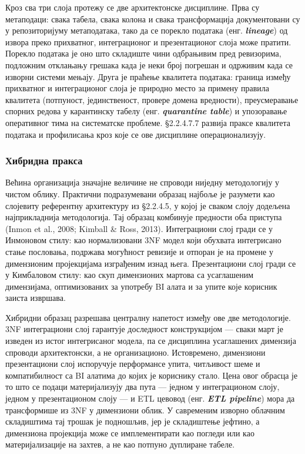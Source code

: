 Кроз сва три слоја протежу се две архитектонске дисциплине. Прва су метаподаци: свака табела, свака колона и свака трансформација документовани су у репозиторијуму метаподатака, тако да се порекло података (енг. \textbf{\textit{lineage}}) од извора преко прихватног, интеграционог и презентационог слоја може пратити. Порекло података је оно што складиште чини одбрањивим пред ревизорима, подложним отклањању грешака када је неки број погрешан и одрживим када се изворни системи мењају. Друга је праћење квалитета података: граница између прихватног и интеграционог слоја је природно место за примену правила квалитета (потпуност, јединственост, провере домена вредности), преусмеравање спорних редова у карантинску табелу (енг. \textbf{\textit{quarantine table}}) и упозоравање оперативног тима на систематске проблеме. §2.2.4.7.7 развија праксе квалитета података и профилисања кроз које се ове дисциплине операционализују.

\subsubsection{Хибридна пракса}
Већина организација значајне величине не спроводи ниједну методологију у чистом облику. Практични подразумевани образац најбоље је разумети као слојевиту референтну архитектуру из §2.2.4.5, у којој је сваком слоју додељена најприкладнија методологија. Тај образац комбинује предности оба приступа (Inmon et al., 2008; Kimball \& Ross, 2013). Интеграциони слој гради се у Инмоновом стилу: као нормализовани 3NF модел који обухвата интегрисано стање пословања, подржава могућност ревизије и отпоран је на промене у димензионим пројекцијама изграђеним изнад њега. Презентациони слој гради се у Кимбаловом стилу: као скуп димензионих мартова са усаглашеним димензијама, оптимизованих за употребу BI алата и за упите које корисник заиста извршава.

Хибридни образац разрешава централну напетост између ове две методологије. 3NF интеграциони слој гарантује доследност конструкцијом — сваки март је изведен из истог интегрисаног модела, па се дисциплина усаглашених димензија спроводи архитектонски, а не организационо. Истовремено, димензиони презентациони слој испоручује перформансе упита, читљивост шеме и компатибилност са BI алатима до којих је кориснику стало. Цена овог обрасца је то што се подаци материјализују два пута — једном у интеграционом слоју, једном у презентационом слоју — и ETL цевовод (енг. \textbf{\textit{ETL pipeline}}) мора да трансформише из 3NF у димензиони облик. У савременим изворно облачним складиштима тај трошак је подношљив, јер је складиштење јефтино, а димензиона пројекција може се имплементирати као погледи или као материјализације на захтев, а не као потпуно дуплиране табеле.

